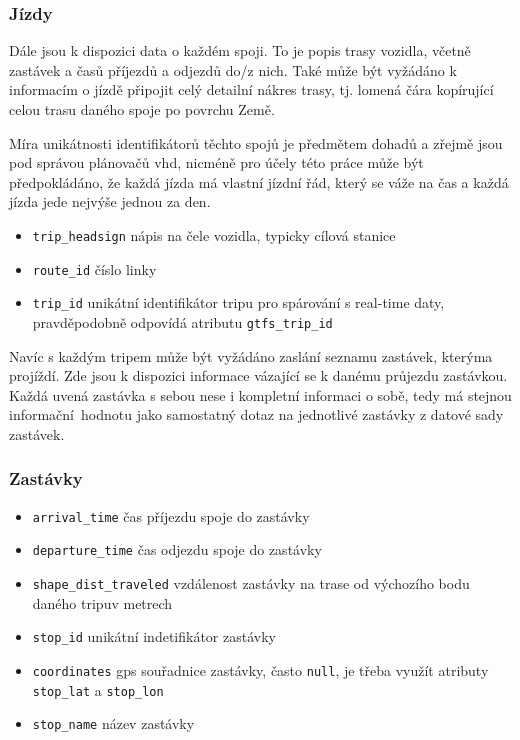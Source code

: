 \subsubsection{Jízdy}

Dále jsou k dispozici data o každém spoji. To je popis trasy vozidla, včetně zastávek a časů příjezdů a odjezdů do/z nich. Také může být vyžádáno k informacím o jízdě připojit celý detailní nákres trasy, tj. lomená čára kopírující celou trasu daného spoje po povrchu Země.

\bigbreak

 Míra unikátnosti identifikátorů těchto spojů je předmětem dohadů a zřejmě jsou pod správou plánovačů \gls{vhd}, nicméně pro účely této práce může být předpokládáno, že každá jízda má vlastní jízdní řád, který se váže na čas a každá jízda jede nejvýše jednou za den.

\begin{itemize}
	\item \verb-trip_headsign- nápis na čele vozidla, typicky cílová stanice

	\item \verb-route_id- číslo linky

	\item \verb-trip_id- unikátní identifikátor tripu pro spárování s real-time daty, pravděpodobně odpovídá atributu \verb"gtfs_trip_id"


\end{itemize}

Navíc s každým tripem může být vyžádáno zaslání seznamu zastávek, kterýma projíždí. Zde jsou k dispozici informace vázající se k danému průjezdu zastávkou. Každá uvená zastávka s sebou nese i kompletní informaci o sobě, tedy má stejnou informační hodnotu jako samostatný dotaz na jednotlivé zastávky z datové sady zastávek.

\subsubsection{Zastávky}

\begin{itemize}
	\item \verb-arrival_time- čas příjezdu spoje do zastávky

	\item \verb-departure_time- čas odjezdu spoje do zastávky

	\item \verb-shape_dist_traveled- vzdálenost zastávky na trase od výchozího bodu daného tripuv metrech

	\item \verb-stop_id- unikátní indetifikátor zastávky

	\item \verb-coordinates- \gls{gps} souřadnice zastávky, často \verb"null", je třeba využít atributy \verb"stop_lat" a \verb"stop_lon"

	\item \verb-stop_name- název zastávky
\end{itemize}

